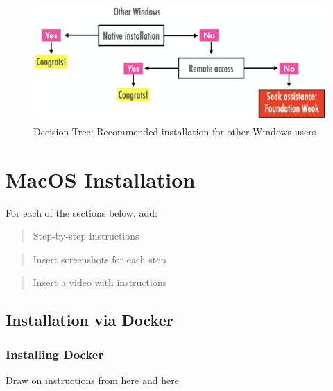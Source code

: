 \documentclass[
]{book}
\begin{document}
\begin{figure}

{\centering \includegraphics[width=16.51in]{figs/other_win} 

}

\caption{Decision Tree: Recommended installation for other Windows users}\label{fig:fig2}
\end{figure}

\hypertarget{mac}{%
\chapter{MacOS Installation}\label{mac}}

For each of the sections below, add:

\begin{quote}
Step-by-step instructions
\end{quote}

\begin{quote}
Insert screenshots for each step
\end{quote}

\begin{quote}
Insert a video with instructions
\end{quote}

\hypertarget{installation-via-docker}{%
\section{Installation via Docker}\label{installation-via-docker}}

\hypertarget{installing-docker}{%
\subsection{Installing Docker}\label{installing-docker}}

Draw on instructions from \href{https://gdsl-ul.github.io/the_knowledge/docker.html}{here} and \href{https://darribas.org/gds_env/guides/docker_install/}{here}
\end{document}
